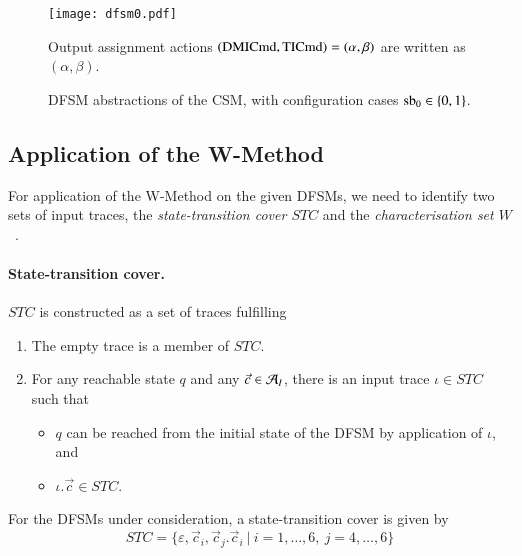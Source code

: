  \begin{figure}
 \begin{center}
\texttt{[image: dfsm0.pdf]}

 \footnotesize
 \bigskip
 Output assignment actions $(\text{DMICmd},\text{TICmd}) = (\alpha,\beta)$ are written as $(\alpha,\beta)$.
 \normalsize
\end{center}
\caption{DFSM abstractions of the CSM, with configuration cases $\text{sb}_0\in\{0,1\}$.}
 \label{fig:dfsmcsm}
 \end{figure}



\subsection{Application of the W-Method}

For application of the W-Method on the given DFSMs, we need to identify two sets of input traces, the {\it state-transition cover $STC$} and the 
{\it characterisation set $W$}~\cite{chow:wmethod,vasilevskii1973}.

\paragraph{State-transition cover.} $STC$ is constructed as a set of traces fulfilling
\begin{enumerate}
\item  The empty trace is a member of $STC$.
\item For any reachable state $q$ and any $\vec c\in {\cal A}_I $, there is an input trace 
$\iota\in STC$ such that 
\begin{itemize}
\item $q$ can be reached from the initial state of the DFSM by application of $\iota$, and
\item $\iota.\vec c\in STC$.
\end{itemize}
\end{enumerate}

For the DFSMs under consideration, a state-transition cover is given by 
$$
STC=\{\varepsilon, \vec c_i, \vec c_j.\vec c_i~|~i=1,\dots,6,\  j=4,\dots,6\}
$$


